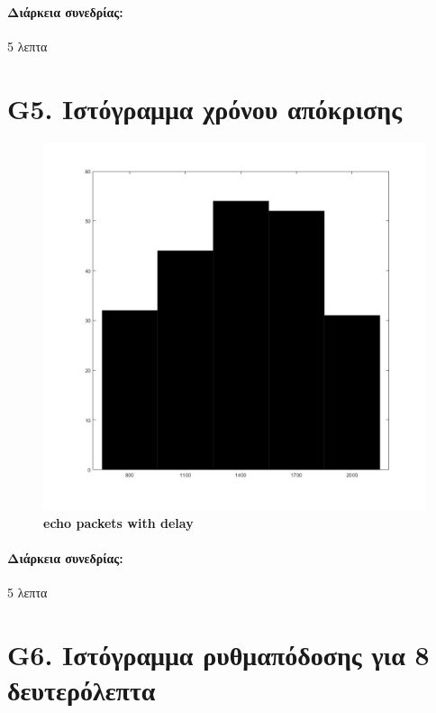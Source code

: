 \documentclass{article}
\begin{document}
\paragraph{Διάρκεια συνεδρίας:} 5 λεπτα
\newpage
\large{}

\section*{G5. Ιστόγραμμα χρόνου απόκρισης}

\begin{figure}[h!]
 \begin{center}
 \advance\leftskip-2.3cm
  \includegraphics[width=160mm,scale=0.7]{g5s1.jpg}
    \caption*{\textbf{echo packets with delay}}
  
\end{center}
\end{figure}
\paragraph{Διάρκεια συνεδρίας:} 5 λεπτα
\newpage
\large{}

\section*{G6. Ιστόγραμμα  ρυθμαπόδοσης για 8 δευτερόλεπτα}
\end{document}
